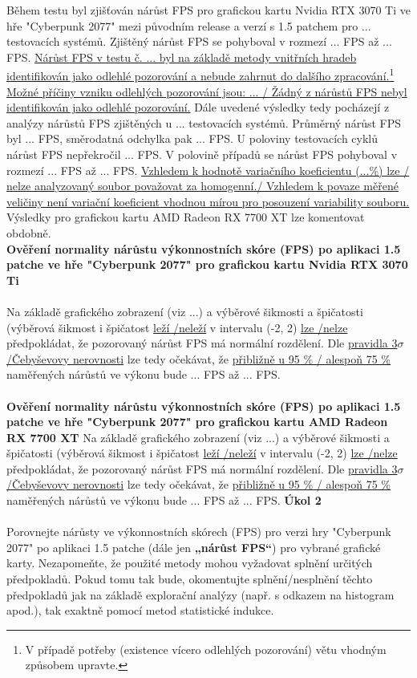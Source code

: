 \documentclass[a4paper,12pt]{article}
\begin{document}
Během testu byl zjišťován nárůst FPS pro grafickou kartu Nvidia RTX 3070 Ti ve hře "Cyberpunk 2077" mezi původním release a verzí s 1.5 patchem pro ... testovacích systémů. Zjištěný nárůst FPS se pohyboval v rozmezí ... FPS až ... FPS. \ul{Nárůst FPS v testu č. ...  byl
na základě metody vnitřních hradeb identifikován jako odlehlé pozorování a nebude zahrnut do dalšího zpracování.\footnote{V případě potřeby (existence vícero odlehlých pozorování) větu vhodným způsobem upravte.} Možné příčiny vzniku odlehlých pozorování jsou: ... / Žádný z nárůstů FPS nebyl identifikován jako odlehlé pozorování.} Dále uvedené výsledky tedy pocházejí z analýzy nárůstů FPS zjištěných u ... testovacích systémů. Průměrný nárůst FPS byl ... FPS, směrodatná odchylka pak ... FPS. U poloviny testovacích cyklů nárůst FPS nepřekročil ... FPS. V polovině případů se nárůst FPS pohyboval v rozmezí ... FPS až ... FPS. \ul{Vzhledem k hodnotě variačního koeficientu (...\%) lze / nelze analyzovaný soubor považovat za homogenní./ Vzhledem k povaze měřené veličiny není variační koeficient vhodnou mírou pro posouzení variability souboru.}\\

Výsledky pro grafickou kartu AMD Radeon RX 7700 XT lze komentovat obdobně.\\

\textbf{Ověření normality nárůstu výkonnostních skóre (FPS) po aplikaci 1.5 patche ve hře "Cyberpunk 2077" pro grafickou kartu Nvidia RTX 3070 Ti}\\\\
Na základě grafického zobrazení (viz ...) a výběrové šikmosti a špičatosti (výběrová šikmost
i špičatost \ul{leží \slash neleží} v intervalu (-2, 2) \ul{lze \slash nelze} předpokládat, že pozorovaný nárůst FPS má normální rozdělení. Dle \ul{pravidla 3$\sigma$ \slash Čebyševovy nerovnosti} lze tedy očekávat, že \ul{přibližně u 95 \% \slash
alespoň 75 \%} naměřených nárůstů ve výkonu bude ... FPS až ... FPS.\\\\

\textbf{Ověření normality nárůstu výkonnostních skóre (FPS) po aplikaci 1.5 patche ve hře "Cyberpunk 2077" pro grafickou kartu AMD Radeon RX 7700 XT}
Na základě grafického zobrazení (viz ...) a výběrové šikmosti a špičatosti (výběrová šikmost
i špičatost \ul{leží \slash neleží} v intervalu (-2, 2) \ul{lze \slash nelze} předpokládat, že pozorovaný nárůst FPS má normální rozdělení. Dle \ul{pravidla 3$\sigma$ \slash Čebyševovy nerovnosti} lze tedy očekávat, že \ul{přibližně u 95 \% \slash
alespoň 75 \%} naměřených nárůstů ve výkonu bude ... FPS až ... FPS.
\newpage
\textbf{Úkol 2}\\\\
Porovnejte nárůsty ve výkonnostních skórech (FPS) pro verzi hry "Cyberpunk 2077" po aplikaci 1.5
patche (dále jen \textbf{„nárůst FPS“}) pro vybrané grafické karty. Nezapomeňte, že použité metody mohou
vyžadovat splnění určitých předpokladů. Pokud tomu tak bude, okomentujte splnění/nesplnění těchto
předpokladů jak na základě explorační analýzy (např. s odkazem na histogram apod.), tak exaktně
pomocí metod statistické indukce.\\
\end{document}
